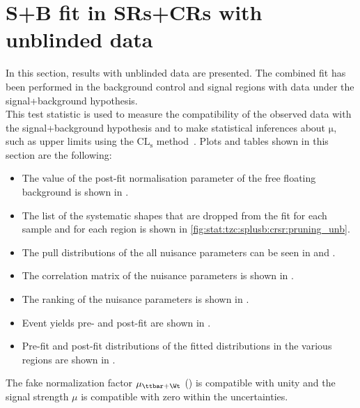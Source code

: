\section{S+B fit in SRs+CRs with unblinded data}
\label{sec:stat:tzc:splusb:unb}
In this section, results with unblinded data are presented. The combined fit has been performed in the background 
control and signal regions with data under the signal+background hypothesis.\\
This test statistic is used to measure the compatibility of the observed data with the signal+background hypothesis 
and to make statistical inferences about $\mathrm{\mu}$, such as upper limits using the $\mathrm{CL_{s}}$ method~\cite{Junk:1999kv,Read:2002hq}.
Plots and tables shown in this section are the following:
\begin{itemize}
	\item The value of the post-fit normalisation parameter of the free floating background is shown in .
	\item The list of the systematic shapes that are dropped from the fit for each sample and for each region is shown in \cref{fig:stat:tzc:splusb:crsr:pruning_unb}.
	\item The pull distributions of the all nuisance parameters can be seen in  and .  
	\item The correlation matrix of the nuisance parameters is shown in .
	\item The ranking of the nuisance parameters is shown in . 
	\item Event yields pre- and post-fit are shown in . 
	\item Pre-fit and post-fit distributions of the fitted distributions in the various regions are shown in .
\end{itemize}
The fake normalization factor $\mu_{\ttbar+\Wt}$ () is compatible with unity and the signal strength $\mu$ is compatible with zero within the uncertainties.\\
